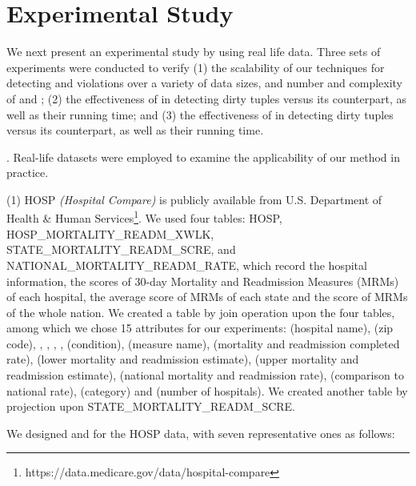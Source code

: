 \section{Experimental Study}
\label{sec-exp}

We next present an experimental study by using real life data. Three sets of experiments
were conducted to verify (1) the scalability of our techniques for detecting \pCFDs and \pCINDs
violations over a variety of data sizes, and number and complexity of \pCFDs and \pCINDs; (2) the
effectiveness of \pCFDs in detecting dirty tuples versus its \CFDs counterpart, as well as their
running time; and (3) the effectiveness of \pCINDs in detecting dirty tuples versus its \CINDs counterpart,
as well as their running time.

. Real-life datasets were employed to examine the applicability of our method in practice.

(1) HOSP \textit{(Hospital Compare)} is publicly available from U.S. Department of Health
\& Human Services\footnote{https://data.medicare.gov/data/hospital-compare}. We used four tables: HOSP, HOSP\_MORTALITY\_READM\_XWLK, STATE\_MORTALITY\_READM\_SCRE, and NATIONAL\_MORTALITY\_READM\_RATE, which record the hospital information, the scores of 30-day Mortality and Readmission Measures (MRMs) of each hospital, the average score of MRMs of each state and the score of MRMs of the whole nation. We created a table  by join operation upon the four tables, among which we chose 15 attributes for our experiments:  (hospital name),  (zip code), , , , ,  (condition),  (measure name),  (mortality and readmission completed rate),  (lower mortality and readmission estimate),  (upper mortality and readmission estimate),  (national mortality and readmission rate),  (comparison to national rate),  (category) and  (number of hospitals). We created another table  by projection upon STATE\_MORTALITY\_READM\_SCRE.

We designed \pCFDs and \pCINDs for the HOSP data, with seven representative ones as follows:\\

